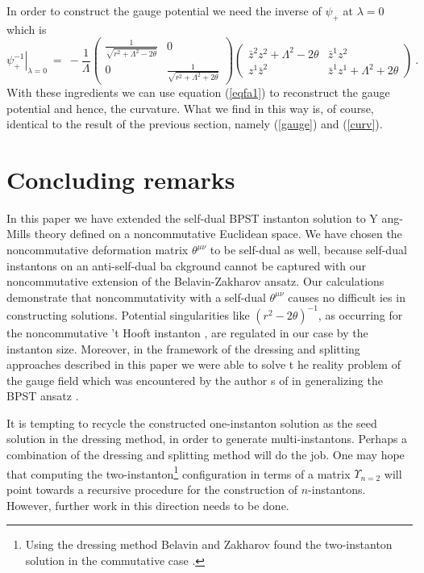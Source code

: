 \documentclass[a4paper,11pt,english]{article}
\numberwithin{equation}{section}
\renewcommand{\=}{\ =\ }
\begin{document}
In order to construct the gauge potential 
we need the inverse of $\psi_+$ at $\lambda=0$ which is
\begin{equation}
 \left.\psi^{-1}_+\right|_{\lambda=0}\=-\frac{1}{\Lambda}\begin{pmatrix}
 \frac{1}{\sqrt{r^2+\Lambda^2-2\theta}} & 0\\
                0 & \frac{1}{\sqrt{r^2+\Lambda^2+2\theta}}
\end{pmatrix}
                 \begin{pmatrix} \bar{z}^2z^2+\Lambda^2-2\theta & \bar{z}%
^1z^2\\[8pt]
                              z^1\bar{z}^2 & \bar{z}^1z^1+\Lambda^2+2\theta
                 \end{pmatrix}\ .
\end{equation}
With these ingredients we can use equation (\ref{eqfa1}) to reconstruct the 
gauge potential %
and hence, the curvature. What we find in this way is, of course, identical
to the result of the previous section, namely (\ref{gauge}) and (\ref{curv}).


\section{Concluding remarks}

In this paper we have extended the self-dual BPST instanton solution to Y%
ang-Mills theory defined on a noncommutative Euclidean space. We %
have chosen the noncommutative deformation matrix $\theta^{\mu\nu}$ to be %
self-dual as well, because self-dual instantons on an anti-self-dual ba%
ckground cannot be captured with our noncommutative extension %
of the Belavin-Zakharov ansatz. Our calculations demonstrate that %
noncommutativity with a self-dual $\theta^{\mu\nu}$ causes no difficult%
ies in constructing solutions. 
Potential singularities like $(r^2{-}2\theta)^{-1}$,
as occurring for the noncommutative 't Hooft instanton 
\cite{Correa:2001wv,Lechtenfeld:2001ie},
are regulated in our case by the instanton size.
Moreover, in the framework of the dressing and splitting approaches 
described in this paper we were able to solve t%
he reality problem of the gauge field which was encountered by the author%
s of \cite{Correa:2001wv} in generalizing the BPST ansatz \cite{Belavin:fg}.

It is tempting to recycle the constructed one-instanton solution as the seed 
solution in the dressing method, in order to generate multi-instantons. 
Perhaps a combination of the dressing and splitting method will do the job. 
One may hope that computing the two-instanton\footnote{
Using the dressing method Belavin and Zakharov found the two-instanton 
solution in the commutative case \cite{Belavin:cz}.} 
configuration in terms of a matrix $\Upsilon_{n=2}$ will point towards a 
recursive procedure for the construction of $n$-instantons. 
However, further work in this direction needs to be done.
\end{document}
